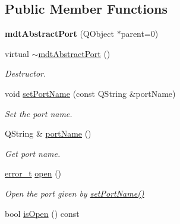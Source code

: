 \subsection*{Public Member Functions}
\begin{DoxyCompactItemize}
\item 
\hypertarget{classmdt_abstract_port_a35e7bff9413690833c832bf115da102f}{
{\bfseries mdtAbstractPort} (QObject $\ast$parent=0)}
\label{classmdt_abstract_port_a35e7bff9413690833c832bf115da102f}

\item 
virtual \hyperlink{classmdt_abstract_port_aa40baa0c593fef984f3796acafceee15}{$\sim$mdtAbstractPort} ()
\begin{DoxyCompactList}\small\item\em Destructor. \end{DoxyCompactList}\item 
void \hyperlink{classmdt_abstract_port_a0ca143d32fc677bac7c1cf0e04144932}{setPortName} (const QString \&portName)
\begin{DoxyCompactList}\small\item\em Set the port name. \end{DoxyCompactList}\item 
\hypertarget{classmdt_abstract_port_ac52fbd121f7cbb848a2f3e5d29fae615}{
QString \& \hyperlink{classmdt_abstract_port_ac52fbd121f7cbb848a2f3e5d29fae615}{portName} ()}
\label{classmdt_abstract_port_ac52fbd121f7cbb848a2f3e5d29fae615}

\begin{DoxyCompactList}\small\item\em Get port name. \end{DoxyCompactList}\item 
\hyperlink{classmdt_abstract_port_ad4121bb930c95887e77f8bafa065a85e}{error\_\-t} \hyperlink{classmdt_abstract_port_a4e0f0b7f9e24257677184e4bde10fdde}{open} ()
\begin{DoxyCompactList}\small\item\em Open the port given by \hyperlink{classmdt_abstract_port_a0ca143d32fc677bac7c1cf0e04144932}{setPortName()} \end{DoxyCompactList}\item 
\hypertarget{classmdt_abstract_port_a2122ae3141342ff38c8388e62b244e3b}{
bool \hyperlink{classmdt_abstract_port_a2122ae3141342ff38c8388e62b244e3b}{isOpen} () const }
\label{classmdt_abstract_port_a2122ae3141342ff38c8388e62b244e3b}


\end{DoxyCompactItemize}
